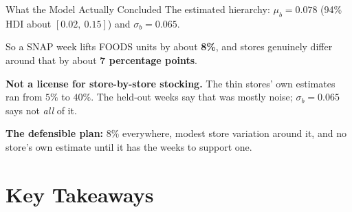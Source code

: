 \documentclass[aspectratio=169, 11pt]{beamer}
\begin{document}
\begin{frame}{What the Model Actually Concluded}
  The estimated hierarchy: $\mu_b = 0.078$ (94\% HDI about $[0.02,\ 0.15]$) and
  $\sigma_b = 0.065$.

  \vspace{0.1cm}
  So a SNAP week lifts FOODS units by about \textbf{8\%}, and stores genuinely differ around that
  by about \textbf{7 percentage points}.

  \begin{warningbox}
    \textbf{Not a license for store-by-store stocking.} The thin stores' own estimates ran from
    $5\%$ to $40\%$. The held-out weeks say that was mostly noise; $\sigma_b = 0.065$ says not
    \emph{all} of it.
  \end{warningbox}

  \vspace{0.1cm}
  \textbf{The defensible plan:} 8\% everywhere, modest store variation around it, and no store's
  own estimate until it has the weeks to support one.
\end{frame}

\section{Key Takeaways}

\end{document}
